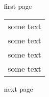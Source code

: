 \documentclass{article}
\newlength{\cellheight}
\begin{document}
first page
\clearpage\enlargethispage{2\baselineskip}
\noindent\begin{tabular}{@{}p{}@{}}
\parbox[t][\cellheight]{.8\textwidth}{some text}\\
\parbox[t][\cellheight]{.8\textwidth}{some text}\\
\parbox[t][\cellheight]{.8\textwidth}{some text}\\
\parbox[t][\cellheight]{.8\textwidth}{some text}
\end{tabular}
\clearpage
next page
\end{document}
